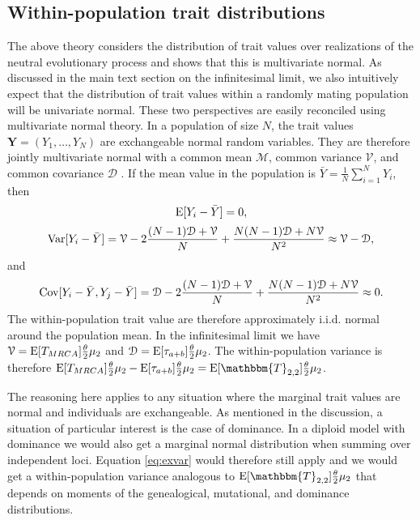 \subsection*{Within-population trait distributions}

The above theory considers the distribution of trait values over realizations of
the neutral evolutionary process and shows that this is multivariate normal. As
discussed in the main text section on the infinitesimal limit, we also
intuitively expect that the distribution of trait values within a randomly
mating population will be univariate normal. These two perspectives are easily
reconciled using multivariate normal theory. In a population of size $N$, the
trait values $\mathbf{Y}=(Y_1,\ldots,Y_N)$ are exchangeable normal random
variables. They are therefore jointly multivariate normal with a common mean
$\mathcal{M}$, common variance $\mathcal{V}$, and common covariance
$\mathcal{D}$ \citep{Tong}. If the mean value in the population is
$\bar{Y}=\frac{1}{N}\sum_{i=1}^N Y_i$, then
\begin{equation}
  \mathrm{E}[Y_i-\bar{Y}] = 0,
\end{equation}
\begin{equation}
  \label{eq:exvar}
  \mathrm{Var}[Y_i-\bar{Y}] = \mathcal{V} - 2 \frac{(N-1)\mathcal{D} + \mathcal{V}}{N} +
  \frac{N(N-1)\mathcal{D} + N\mathcal{V}}{N^2} \approx \mathcal{V} - \mathcal{D},
\end{equation}
and
\begin{equation}
  \mathrm{Cov}[Y_i-\bar{Y},Y_j-\bar{Y}] = \mathcal{D} - 2 \frac{(N-1)\mathcal{D} + \mathcal{V}}{N} +
  \frac{N(N-1)\mathcal{D} + N\mathcal{V}}{N^2} \approx 0.
\end{equation}
The within-population trait value are therefore approximately i.i.d. normal
around the population mean. In the infinitesimal limit we have $\mathcal{V} =
\mathrm{E}[T_{MRCA}] \frac{\theta}{2} \mu_2$ and $\mathcal{D} = \mathrm{E}[\tau_{a+b}] \frac{\theta}{2} \mu_2$. The
within-population variance is therefore $\E[T_{MRCA}] \T \mu_2 - \E[\tau_{a+b}]
\T \mu_2 = \E[\mathbbm{T}_{2,2}]\T\mu_2$.

The reasoning here applies to any situation where the marginal trait values are
normal and individuals are exchangeable. As mentioned in the discussion, a
situation of particular interest is the case of dominance. In a diploid model
with dominance we would also get a marginal normal distribution when summing
over independent loci. Equation \eqref{eq:exvar} would therefore still apply and
we would get a within-population variance analogous to
$\E[\mathbbm{T}_{2,2}]\T\mu_2$ that depends on moments of the genealogical,
mutational, and dominance distributions.

